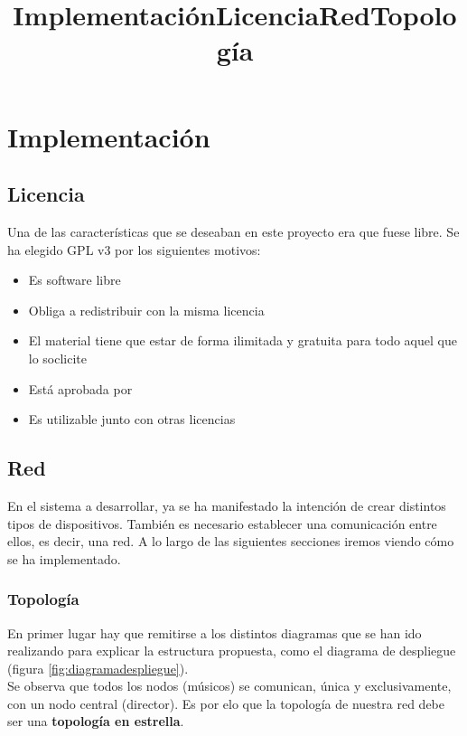 \chapter{Implementación}
\title{Implementación}
\label{cap:Implementacion}

\section{Licencia}
\title{Licencia}

Una de las características que se deseaban en este proyecto era que fuese libre.
Se ha elegido GPL v3 por los siguientes motivos:
\begin{itemize}
  \item Es software libre
  \item Obliga a redistribuir con la misma licencia
  \item El material tiene que estar de forma ilimitada y gratuita para todo aquel que lo soclicite
  \item Está aprobada por 
  \item Es utilizable junto con otras licencias
\end{itemize}


\section{Red}
\title{Red}

En el sistema a desarrollar, ya se ha manifestado la intención de crear distintos
tipos de dispositivos. También es necesario establecer una comunicación entre ellos,
es decir, una red. A lo largo de las siguientes secciones iremos viendo cómo se
ha implementado.\\

\subsection{Topología}
\title{Topología}
En primer lugar hay que remitirse a los distintos diagramas que se han ido
realizando para explicar la estructura propuesta, como el diagrama de despliegue (figura \ref{fig:diagramadespliegue}).\\

Se observa que todos los nodos (músicos) se comunican, única y exclusivamente, con un nodo central (director).
Es por elo que la topología de nuestra red debe ser una \textbf{topología en estrella}.\\

